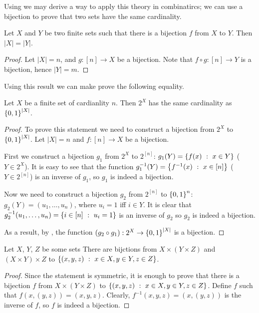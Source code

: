 Using  we may derive a way to apply this
theory in combinatircs; we can use a bijection to prove that two sets have the
same cardinality.
\begin{theorem}
  Let $X$ and $Y$ be two finite sets such that there is a bijection $f$ from
  $X$ to $Y$. Then $|X| = |Y|$.
\end{theorem}
\begin{proof}
  Let $|X| = n$, and $g : [n] \to X$ be a bijection.
  Note that $f \circ g : [n] \to Y$ is a bijection, hence $|Y| = m$.
\end{proof}

Using this result we can make prove the following equality.
\begin{corollary}
\label{corollary:power-set-and-set-of-binary-strings}
  Let $X$ be a finite set of cardianlity $n$. Then $2^X$ has the same
  cardinality as $\set{0, 1}^{|X|}$.
\end{corollary}
\begin{proof}
  To prove this statement we need to construct a bijection from $2^X$ to
  $\set{0, 1}^{|X|}$. Let $|X| = n$ and $f : [n] \to X$ be a bijection.

  First we construct a bijection $g_1$ from $2^X$ to $2^{[n]}$:
  $g_1(Y) = \set[x \in Y]{f(x)}$ ($Y \in 2^X$). It is easy to see that the
  function $g^{-1}_1(Y) = \set[{x \in [n]}]{f^{-1}(x)}$ ($Y \in 2^{[n]}$) is an
  inverse of $g_1$, so $g_1$ is indeed a bijection.

  Now we need to construct a bijection $g_2$ from $2^{[n]}$ to $\set{0, 1}^n$:
  $g_2(Y) = (u_1, \dots, u_n)$, where $u_i = 1$ iff $i \in Y$. It is clear
  that $g^{-1}_2(u_1, \dots, u_n) = \set[u_i = 1]{i \in [n]}$ is an inverse
  of $g_2$ so $g_2$ is indeed a bijection.

  As a result, by , the function
  $(g_2 \circ g_1) : 2^X \to \set{0, 1}^{|X|}$ is a bijection.
\end{proof}

\begin{theorem}
  Let $X$, $Y$, $Z$ be some sets
  There are bijctions from $X \times (Y \times Z)$ and
  $(X \times Y) \times Z$ to $\set[x \in X, y \in Y, z \in Z]{(x, y, z)}$.
\end{theorem}
\begin{proof}
  Since the statement is symmetric, it is enough to prove that there is
  a bijection $f$ from $X \times (Y \times Z)$ to
  $\set[x \in X, y \in Y, z \in Z]{(x, y, z)}$. Define $f$ such that
  $f(x, (y, z)) = (x, y, z)$.
  Clearly, $f^{-1}(x, y, z) = (x, (y, z))$ is the inverse of $f$, so $f$ is
  indeed a bijection.
\end{proof}

